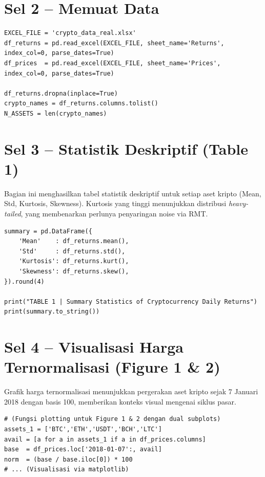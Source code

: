 \documentclass[12pt,a4paper]{article}
\begin{document}
\section{Sel 2 -- Memuat Data}
\begin{lstlisting}[caption={Load dataset kripto dan pembersihan data}]
EXCEL_FILE = 'crypto_data_real.xlsx'
df_returns = pd.read_excel(EXCEL_FILE, sheet_name='Returns', index_col=0, parse_dates=True)
df_prices  = pd.read_excel(EXCEL_FILE, sheet_name='Prices',  index_col=0, parse_dates=True)

df_returns.dropna(inplace=True)
crypto_names = df_returns.columns.tolist()
N_ASSETS = len(crypto_names)
\end{lstlisting}

\section{Sel 3 -- Statistik Deskriptif (Table 1)}
Bagian ini menghasilkan tabel statistik deskriptif untuk setiap aset kripto (Mean, Std, Kurtosis, Skewness). Kurtosis yang tinggi menunjukkan distribusi \textit{heavy-tailed}, yang membenarkan perlunya penyaringan noise via RMT.

\begin{lstlisting}[caption={Kalkulasi statistik deskriptif aset}]
summary = pd.DataFrame({
    'Mean'    : df_returns.mean(),
    'Std'     : df_returns.std(),
    'Kurtosis': df_returns.kurt(),
    'Skewness': df_returns.skew(),
}).round(4)

print("TABLE 1 | Summary Statistics of Cryptocurrency Daily Returns")
print(summary.to_string())
\end{lstlisting}

\section{Sel 4 -- Visualisasi Harga Ternormalisasi (Figure 1 \& 2)}
Grafik harga ternormalisasi menunjukkan pergerakan aset kripto sejak 7 Januari 2018 dengan basis 100, memberikan konteks visual mengenai siklus pasar.

\begin{lstlisting}[caption={Plotting harga ternormalisasi per kelompok aset}]
# (Fungsi plotting untuk Figure 1 & 2 dengan dual subplots)
assets_1 = ['BTC','ETH','USDT','BCH','LTC']
avail = [a for a in assets_1 if a in df_prices.columns]
base  = df_prices.loc['2018-01-07':, avail]
norm  = (base / base.iloc[0]) * 100
# ... (Visualisasi via matplotlib)
\end{lstlisting}
\end{document}
